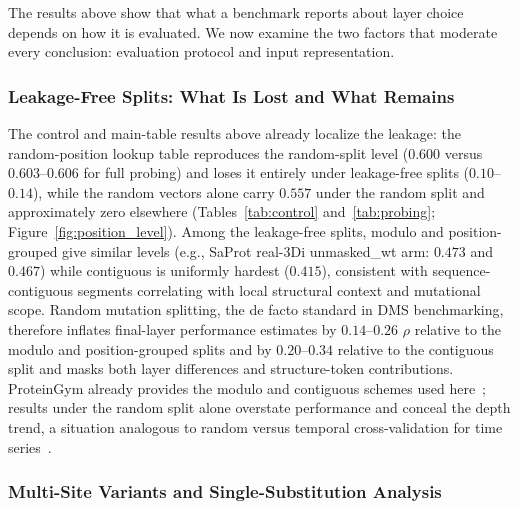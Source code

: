 \documentclass[numbered,webpdf,modern,large]{oup-authoring-template}
\newcommand{\rone}[1]{#1}
\newcommand{\rtwo}[1]{#1}
\newcommand{\rthree}[1]{#1}
\begin{document}
\rtwo{The results above show that what a benchmark reports about layer choice depends
on how it is evaluated. We now examine the two factors that moderate every
conclusion: evaluation protocol and input representation.}

\subsubsection{\rone{Leakage-Free Splits: What Is Lost and What Remains}}

\rone{The control and main-table results above already localize the leakage: the
random-position lookup table reproduces the random-split level ($0.600$ versus
$0.603$--$0.606$ for full probing) and loses it entirely under leakage-free splits
($0.10$--$0.14$), while the random vectors alone carry $0.557$ under the random
split and approximately zero elsewhere (Tables~\ref{tab:control}
and~\ref{tab:probing}; Figure~\ref{fig:position_level}). Among the leakage-free
splits, modulo and position-grouped give similar levels (e.g., SaProt real-3Di
\rthree{unmasked\_wt arm: $0.473$ and $0.467$}) while contiguous is uniformly hardest (\rthree{$0.415$}),
consistent with sequence-contiguous segments correlating with local structural
context and mutational scope. Random mutation splitting, the de facto standard in DMS
benchmarking, therefore inflates \rthree{final-layer} performance estimates by
\rthree{$0.14$--$0.26$ $\rho$ relative to the modulo and position-grouped splits and by
$0.20$--$0.34$ relative to the contiguous split} and masks both layer differences and
structure-token contributions. \rtwo{ProteinGym already provides the modulo and
contiguous schemes used here~\cite{notin2024proteingym}; results under the random split
alone overstate performance and conceal the depth trend, a situation analogous to
random versus temporal cross-validation for time series~\cite{roberts2017crossvalidation}.}}

\subsubsection{\rtwo{Multi-Site Variants \rthree{and Single-Substitution Analysis}}}
\end{document}
